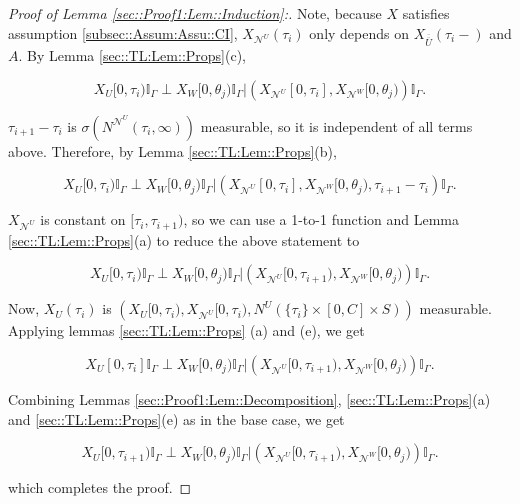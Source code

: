 \documentclass[12pt]{article}
\newcommand{\mb}{\mathbb}
\newcommand{\mc}{\mathcal}
\newcommand{\ov}{\overline}
\renewcommand{\U}{U}							%
\newcommand{\UU}{W}								%
\renewcommand{\S}{S}							%
\newcommand{\X}{X}								%
\newcommand{\neigh}{\mc{N}}						%
\newcommand{\vind}[1]{^{#1}}					%
\newcommand{\cind}[1]{_{#1}}					%
\newcommand{\cl}{\ov}							%
\newcommand{\tp}[1]{(#1)}						%
\newcommand{\tip}[1]{#1}						%
\newcommand{\const}{C}							%
\newcommand{\poiss}{N}							%
\newcommand{\indx}[1]{_{#1}}					%
\newcommand{\rt}{\tau}							%
\newcommand{\rtt}{\theta}						%
\newcommand{\apath}{\Gamma}						%
\newcommand{\rv}{A}								%
\begin{document}
\begin{proof}[Proof of Lemma \ref{sec::Proof1:Lem::Induction}:]
Note, because \(\X\) satisfies assumption \ref{subsec::Assum:Assu::CI}, \(\X\cind{\neigh\vind{\U}}\tp{\rt\indx{i}}\) only depends on \(\X\cind{\cl{\cl{\U}}}\tp{\rt\indx{i}-}\) and \(\rv\). By Lemma \ref{sec::TL:Lem::Props}(c), 

\[\X\cind{\U}\tip{[0,\rt\indx{i})}\mb{I}_{\apath}\perp \X\cind{\UU}\tip{[0,\rtt\indx{j})}\mb{I}_{\apath}|\left(\X\cind{\neigh\vind{\U}}\tip{[0,\rt\indx{i}]},\X\cind{\neigh\vind{\UU}}\tip{[0,\rtt\indx{j})}\right)\mb{I}_{\apath}.\]

\(\rt\indx{i+1} - \rt\indx{i}\) is \(\sigma(\poiss\vind{\neigh\vind{\U}}(\rt\indx{i},\infty))\) measurable, so it is independent of all terms above. Therefore, by Lemma \ref{sec::TL:Lem::Props}(b),

\[\X\cind{\U}\tip{[0,\rt\indx{i})}\mb{I}_{\apath}\perp \X\cind{\UU}\tip{[0,\rtt\indx{j})}\mb{I}_{\apath}|\left(\X\cind{\neigh\vind{\U}}\tip{[0,\rt\indx{i}]},\X\cind{\neigh\vind{\UU}}\tip{[0,\rtt\indx{j})},\rt\indx{i+1} - \rt\indx{i}\right)\mb{I}_{\apath}.\]

\(\X\cind{\neigh\vind{\U}}\) is constant on \([\rt\indx{i},\rt\indx{i+1})\), so we can use a 1-to-1 function and Lemma \ref{sec::TL:Lem::Props}(a) to reduce the above statement to

\[\X\cind{\U}\tip{[0,\rt\indx{i})}\mb{I}_{\apath}\perp \X\cind{\UU}\tip{[0,\rtt\indx{j})}\mb{I}_{\apath}|\left(\X\cind{\neigh\vind{\U}}\tip{[0,\rt\indx{i+1})},\X\cind{\neigh\vind{\UU}}\tip{[0,\rtt\indx{j})}\right)\mb{I}_{\apath}.\]

Now, \(\X\cind{\U}\tp{\rt\indx{i}}\) is \(\left(\X\cind{\U}\tip{[0,\rt\indx{i})}, \X\cind{\neigh\vind{\U}}\tip{[0,\rt\indx{i})}, \poiss\vind{\U}(\{\rt\indx{i}\}\times [0,\const]\times\S)\right)\) measurable. Applying lemmas \ref{sec::TL:Lem::Props} (a) and (e), we get

\[\X\cind{\U}\tip{[0,\rt\indx{i}]}\mb{I}_{\apath}\perp \X\cind{\UU}\tip{[0,\rtt\indx{j})}\mb{I}_{\apath}|\left(\X\cind{\neigh\vind{\U}}\tip{[0,\rt\indx{i+1})},\X\cind{\neigh\vind{\UU}}\tip{[0,\rtt\indx{j})}\right)\mb{I}_{\apath}.\]

Combining Lemmas \ref{sec::Proof1:Lem::Decomposition}, \ref{sec::TL:Lem::Props}(a) and \ref{sec::TL:Lem::Props}(e) as in the base case, we get

\[\X\cind{\U}\tip{[0,\rt\indx{i+1})}\mb{I}_{\apath}\perp \X\cind{\UU}\tip{[0,\rtt\indx{j})}\mb{I}_{\apath}|\left(\X\cind{\neigh\vind{\U}}\tip{[0,\rt\indx{i+1})},\X\cind{\neigh\vind{\UU}}\tip{[0,\rtt\indx{j})}\right)\mb{I}_{\apath}.\]

which completes the proof.
\end{proof}
\end{document}
